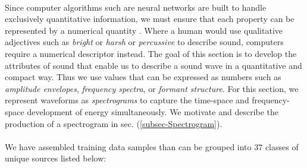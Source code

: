 \documentclass[12pt,letterpaper]{article}
\begin{document}
\paragraph*{}Since computer algorithms such are neural networks are built to handle exclusively quantitative information, we must ensure that each property can be represented by a numerical quantity \cite{Geron,Levine}. Where a human would use qualitative adjectives such as \textit{bright} or \textit{harsh} or \textit{percussive} to describe sound, computers require a numerical descriptor instead. The goal of this section is to develop the attributes of sound that enable us to describe a sound wave in a quantitative and compact way. Thus we use values that can be expressed as numbers such as \textit{amplitude envelopes}, \textit{frequency spectra}, or \textit{formant structure}. For this section, we represent waveforms as \textit{spectrograms} to capture the time-space and frequency-space development of energy simultaneously. We motivate and describe the production of a spectrogram in sec. (\ref{subsec-Spectrogram}).

\paragraph*{}We have assembled training data samples than can be grouped into $37$ classes of unique sources listed below:
\end{document}
